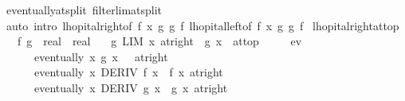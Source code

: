 \begin{isabellebody}
\ eventually{\isacharunderscore}{\kern0pt}at{\isacharunderscore}{\kern0pt}split\ filterlim{\isacharunderscore}{\kern0pt}at{\isacharunderscore}{\kern0pt}split\isanewline
\ \ \isamarkupfalse%
\ {\isacharparenleft}{\kern0pt}auto\ intro{\isacharbang}{\kern0pt}{\isacharcolon}{\kern0pt}\ lhopital{\isacharunderscore}{\kern0pt}right{\isacharbrackleft}{\kern0pt}of\ f\ x\ g\ g{\isacharprime}{\kern0pt}\ f{\isacharprime}{\kern0pt}{\isacharbrackright}{\kern0pt}\ lhopital{\isacharunderscore}{\kern0pt}left{\isacharbrackleft}{\kern0pt}of\ f\ x\ g\ g{\isacharprime}{\kern0pt}\ f{\isacharprime}{\kern0pt}{\isacharbrackright}{\kern0pt}{\isacharparenright}{\kern0pt}%
\endisatagproof
{\isafoldproof}%
%
\isadelimproof
\isanewline
%
\endisadelimproof
\isanewline
\isanewline
{}\isamarkupfalse%
\ lhopital{\isacharunderscore}{\kern0pt}right{\isacharunderscore}{\kern0pt}{}{\isacharunderscore}{\kern0pt}at{\isacharunderscore}{\kern0pt}top{\isacharcolon}{\kern0pt}\isanewline
\ \ \ f\ g\ {\isacharcolon}{\kern0pt}{\isacharcolon}{\kern0pt}\ {\isachardoublequoteopen}real\ {\isasymRightarrow}\ real{\isachardoublequoteclose}\isanewline
\ \ \ g{\isacharunderscore}{\kern0pt}{}{\isacharcolon}{\kern0pt}\ {\isachardoublequoteopen}LIM\ x\ at{\isacharunderscore}{\kern0pt}right\ {}{\isachardot}{\kern0pt}\ g\ x\ {\isacharcolon}{\kern0pt}{\isachargreater}{\kern0pt}\ at{\isacharunderscore}{\kern0pt}top{\isachardoublequoteclose}\isanewline
\ \ \ \ \ ev{\isacharcolon}{\kern0pt}\isanewline
\ \ \ \ \ \ {\isachardoublequoteopen}eventually\ {\isacharparenleft}{\kern0pt}{\isasymlambda}x{\isachardot}{\kern0pt}\ g{\isacharprime}{\kern0pt}\ x\ {\isasymnoteq}\ {}{\isacharparenright}{\kern0pt}\ {\isacharparenleft}{\kern0pt}at{\isacharunderscore}{\kern0pt}right\ {}{\isacharparenright}{\kern0pt}{\isachardoublequoteclose}\isanewline
\ \ \ \ \ \ {\isachardoublequoteopen}eventually\ {\isacharparenleft}{\kern0pt}{\isasymlambda}x{\isachardot}{\kern0pt}\ DERIV\ f\ x\ {\isacharcolon}{\kern0pt}{\isachargreater}{\kern0pt}\ f{\isacharprime}{\kern0pt}\ x{\isacharparenright}{\kern0pt}\ {\isacharparenleft}{\kern0pt}at{\isacharunderscore}{\kern0pt}right\ {}{\isacharparenright}{\kern0pt}{\isachardoublequoteclose}\isanewline
\ \ \ \ \ \ {\isachardoublequoteopen}eventually\ {\isacharparenleft}{\kern0pt}{\isasymlambda}x{\isachardot}{\kern0pt}\ DERIV\ g\ x\ {\isacharcolon}{\kern0pt}{\isachargreater}{\kern0pt}\ g{\isacharprime}{\kern0pt}\ x{\isacharparenright}{\kern0pt}\ {\isacharparenleft}{\kern0pt}at{\isacharunderscore}{\kern0pt}right\ {}{\isacharparenright}{\kern0pt}{\isachardoublequoteclose}\isanewline

\end{isabellebody}
